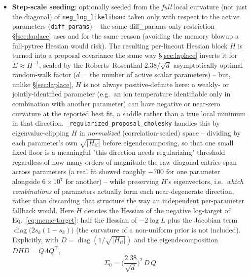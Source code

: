 \documentclass[11pt]{article}
\newcommand{\code}[1]{\texttt{#1}}
\begin{document}
\begin{itemize}
    efficiently along a real correlated or degenerate ridge instead of proposing
    independent per-axis moves that almost always land off of it. Since the proposal is
    symmetric, the Metropolis acceptance ratio is just the posterior-density ratio (no
    Hastings correction term).
  \item \textbf{Step-scale seeding}: optionally seeded from the \emph{full} local curvature
    (not just the diagonal) of \code{neg\_log\_likelihood} taken only with respect to the
    active parameters (\code{diff\_params}) -- the same diff\_params-only restriction
    \S\ref{sec:laplace} uses and for the same reason (avoiding the memory blowup a
    full-pytree Hessian would risk). The resulting per-lineout Hessian block $H$ is turned
    into a proposal covariance the same way \S\ref{sec:laplace} inverts it for
    $\Sigma\approx H^{-1}$, scaled by the Roberts--Rosenthal $2.38/\sqrt d$
    asymptotically-optimal random-walk factor \cite{roberts2001} ($d$ = the number of
    active scalar parameters) -- but, unlike \S\ref{sec:laplace}, $H$ is not always
    positive-definite here: a weakly- or jointly-identified parameter (e.g.\ an ion
    temperature identifiable only in combination with another parameter) can have negative
    or near-zero curvature at the reported best fit, a saddle rather than a true local
    minimum in that direction. \code{\_regularized\_proposal\_cholesky} handles this by
    eigenvalue-clipping $H$ in \emph{normalized} (correlation-scaled) space -- dividing by
    each parameter's own $\sqrt{\vert H_{ii}\vert}$ before eigendecomposing, so that one
    small fixed floor is a meaningful "this direction needs regularizing" threshold
    regardless of how many orders of magnitude the raw diagonal entries span across
    parameters (a real fit showed roughly $-700$ for one parameter alongside $6\times10^7$
    for another) -- while preserving $H$'s eigenvectors, i.e.\ \emph{which combinations} of
    parameters actually form each near-degenerate direction, rather than discarding that
    structure the way an independent per-parameter fallback would. Here $H$ denotes the
    Hessian of the negative log-target of Eq.~\ref{eq:mcmc-target}: half the Hessian of
    $-2\log L$ plus the Jacobian term $\operatorname{diag}\big(2s_k(1-s_k)\big)$ (the
    curvature of a non-uniform prior is not included). Explicitly, with
    $D=\operatorname{diag}(1/\sqrt{\vert H_{ii}\vert})$ and the eigendecomposition
    $DHD=Q\Lambda Q^\top$,
    \begin{equation}
      \Sigma_0=\Big(\frac{2.38}{\sqrt d}\Big)^{2}\,D\,Q\,

\end{equation}
\end{itemize}
\end{document}
